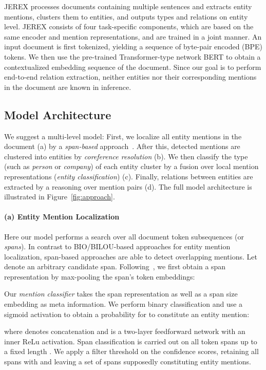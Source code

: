 \documentclass[11pt,a4paper]{article}
\newcommand\name{JEREX}
\begin{document}
\name{} processes documents containing multiple sentences and extracts entity mentions, clusters them to entities, and outputs types and relations on entity level. \name{} consists of four task-specific components, which are based on the same encoder and mention representations, and are trained in a joint manner. An input document is first tokenized, yielding a sequence of   byte-pair encoded (BPE) \cite{sennrich:2016:bpe} tokens. We then use the pre-trained Transformer-type network BERT \cite{devlin:2018:bert} to obtain a contextualized embedding sequence  of the document. Since our goal is to perform end-to-end relation extraction, neither entities nor their corresponding mentions in the document are known in inference. 

\subsection{Model Architecture}
We suggest a multi-level model: First, we localize all entity mentions in the document (a) by a \emph{span-based} approach~\cite{lee:2017:span_coreference}. After this, detected mentions are clustered into entities by \emph{coreference resolution} (b). We then classify the type (such as \emph{person} or \emph{company}) of each entity cluster by a fusion over local mention representations (\emph{entity classification}) (c). Finally, relations between entities are extracted by a reasoning over mention pairs (d). The full model architecture is illustrated in Figure~\ref{fig:approach}.

\paragraph{(a) Entity Mention Localization} Here our model performs a search over all document token subsequences (or \emph{spans}). In contrast to BIO/BILOU-based approaches for entity mention localization, span-based approaches are able to detect overlapping mentions. Let   denote an arbitrary candidate span. Following~\citet{eberts:2019:spert}, we first obtain a span representation by max-pooling the span's token embeddings: 

Our \emph{mention classifier} takes the span representation  as well as a span size embedding  \cite{lee:2017:span_coreference} as meta information. We perform binary classification and use a sigmoid activation to obtain a probability for  to constitute an entity mention: 

where  denotes concatenation and  is a two-layer feedforward network with an inner ReLu activation.
Span classification is carried out on all token spans up to a fixed length . We apply a filter threshold  on the confidence scores, retaining all spans with  and  leaving a set  of spans supposedly constituting entity mentions.
\end{document}
